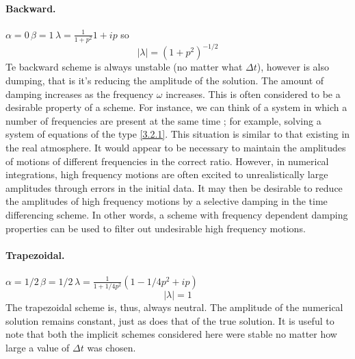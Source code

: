 \paragraph{Backward.} $\alpha=0 \, \beta=1 \, \lambda=\frac{1}{1+p^2}1+ip$
so $$|\lambda|=(1+p^2)^{-1/2}$$
Te backward scheme is always unstable (no matter what $\Delta t$), however is also dumping, that is it's reducing the amplitude of the solution. The amount of damping increases as the frequency $\omega$ increases. This is often considered to be a desirable property of a scheme. For instance, we can think of a system in which a number of frequencies are present at the same time ; for example, solving a system of equations of the type \ref{3.2.1}. This situation is similar to that existing in the real atmosphere. It would appear to be necessary to maintain the amplitudes of motions of different frequencies in the correct ratio. However, in numerical integrations, high frequency motions are often excited to unrealistically large amplitudes through errors in the initial data. It may then be desirable to reduce the amplitudes of high frequency motions by a selective damping in the time differencing scheme. In other words, a scheme with frequency dependent damping properties can be used to filter out undesirable high frequency motions.
\paragraph{Trapezoidal.} $\alpha=1/2 \, \beta=1/2 \, \lambda=\frac{1}{1+1/4p^2}\left(1-1/4p^2+ip\right)$
$$|\lambda|=1$$
The trapezoidal scheme is, thus, always neutral. The amplitude of the numerical solution remains constant, just as does that of the true solution. It is useful to note that both the implicit schemes considered here were stable no matter how large a value of $\Delta t$ was chosen.
